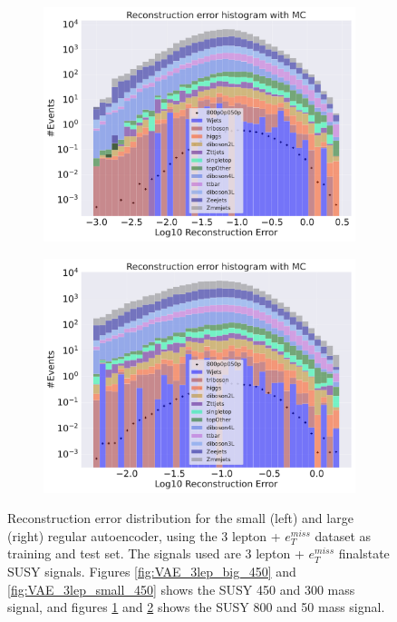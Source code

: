 \begin{figure}[H]
\begin{subfigure}{.45\textwidth}
    \end{subfigure}
    \hfill
    \begin{subfigure}{.45\textwidth}
        \includegraphics[width=\textwidth]{Figures/VAE_testing/big/3lep/b_data_recon_big_rm3_feats_sig_800p0p050p.pdf}
        \caption{}
        \label{fig:VAE_3lep_big_800}
    \end{subfigure}
    \hfill   
    \begin{subfigure}{.45\textwidth}
        \includegraphics[width=\textwidth]{Figures/VAE_testing/small/3lep/b_data_recon_big_rm3_feats_sig_800p0p050p.pdf}
        \caption{}
        \label{fig:VAE_3lep_small_800}
    \end{subfigure}
    \hfill      
    \caption[3lep reconstruction error with SUSY signals for VAE]{Reconstruction error distribution for the small (left) and large (right)
    regular autoencoder, using the 3 lepton + $e_T^{miss}$ dataset as training and test set. The signals used are 3 lepton + $e_T^{miss}$ 
    finalstate SUSY signals. Figures \ref{fig:VAE_3lep_big_450} and \ref{fig:VAE_3lep_small_450} shows the SUSY 450 and 300 mass signal, 
    and figures \ref{fig:VAE_3lep_big_800} and \ref{fig:VAE_3lep_small_800} shows the SUSY 800 and 50 mass signal.}
    \label{fig:VAE_3lep_recon_err_both_sig}
\end{figure}


